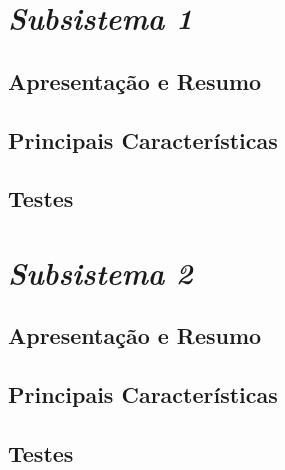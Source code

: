 \section{\textit{Subsistema 1}}

\subsection{Apresentação e Resumo}

\subsection{Principais Características}

\subsubsection{}

\subsection{Testes}

\section{\textit{Subsistema 2}}

\subsection{Apresentação e Resumo}

\subsection{Principais Características}

\subsection{Testes}